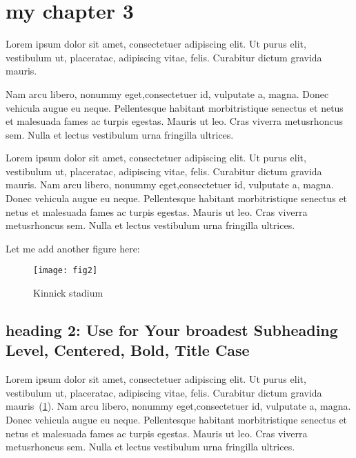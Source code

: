 \section{my chapter 3}

Lorem ipsum dolor sit amet, consectetuer adipiscing elit.  Ut purus elit, vestibulum ut, placeratac,  adipiscing vitae,  felis.   Curabitur dictum gravida mauris.  

Nam arcu libero,  nonummy eget,consectetuer id, vulputate a, magna. Donec vehicula augue eu neque. Pellentesque habitant morbitristique senectus et netus et malesuada fames ac turpis egestas. Mauris ut leo. Cras viverra metusrhoncus sem.  Nulla et lectus vestibulum urna fringilla ultrices. \textcite{zuo2017state}

Lorem ipsum dolor sit amet, consectetuer adipiscing elit.  Ut purus elit, vestibulum ut, placeratac,  adipiscing vitae,  felis.   Curabitur dictum gravida mauris.  
Nam arcu libero,  nonummy eget,consectetuer id, vulputate a, magna. Donec vehicula augue eu neque. Pellentesque habitant morbitristique senectus et netus et malesuada fames ac turpis egestas. Mauris ut leo. Cras viverra metusrhoncus sem.  Nulla et lectus vestibulum urna fringilla ultrices. 

Let me add another figure here:

\begin{figure}[h]
    \centering
    \captionsetup{width=0.7\linewidth} %
    \caption{Kinnick stadium}
    \texttt{[image: fig2]}
    \label{fig:2}
\end{figure}

\subsection{heading 2: Use for Your broadest Subheading Level, Centered, Bold, Title Case}

Lorem ipsum dolor sit amet, consectetuer adipiscing elit.  Ut purus elit, vestibulum ut, placeratac,  adipiscing vitae,  felis.   Curabitur dictum gravida mauris~(\cref{fig:2}).  
Nam arcu libero,  nonummy eget,consectetuer id, vulputate a, magna. Donec vehicula augue eu neque. Pellentesque habitant morbitristique senectus et netus et malesuada fames ac turpis egestas. Mauris ut leo. Cras viverra metusrhoncus sem.  Nulla et lectus vestibulum urna fringilla ultrices. 
